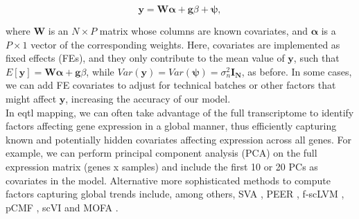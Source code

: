 \begin{equation}\label{eq:Linear_regression_genetics_covariates}
 \mathbf{y} =  \mathbf{W}\boldsymbol{\alpha} + \mathbf{g}\beta + \boldsymbol{\psi}, 
\end{equation}

where $\mathbf{W}$ is an $N \times P$ matrix whose columns are known covariates, and $\boldsymbol{\alpha}$ is a $P \times 1$ vector of the corresponding weights.
Here, covariates are implemented as fixed effects (FEs), and they only contribute to the mean value of $\mathbf{y}$, such that $E[\mathbf{y}] = \mathbf{W}\boldsymbol{\alpha} + \mathbf{g}\beta$, while $Var(\mathbf{y}) = Var(\boldsymbol{\psi}) = \sigma_n^2 \mathbf{I_N} $, as before.
In some cases, we can add FE covariates to adjust for
technical batches
or other factors that might 
affect $\mathbf{y}$, 
increasing the accuracy of our model.
\\

In \gls{eqtl} mapping, we can often take advantage of the 
full transcriptome
to identify 
factors
affecting
gene expression in a global manner, 
thus efficiently capturing known and potentially hidden covariates affecting expression across all genes.
For example, we can perform principal component analysis (PCA) on the full expression matrix (genes x samples) and include the first 10 or 20 PCs as covariates in the model.
Alternative more sophisticated methods to compute factors capturing global trends include, among others, 
SVA \cite{leek2007capturing}, 
PEER \cite{stegle2010bayesian, stegle2012using},
f-scLVM \cite{buettner2017f},
pCMF \cite{durif2019probabilistic},
scVI \cite{lopez2018deep, svensson2020interpretable}
and 
MOFA \cite{argelaguet2018multi}. 




